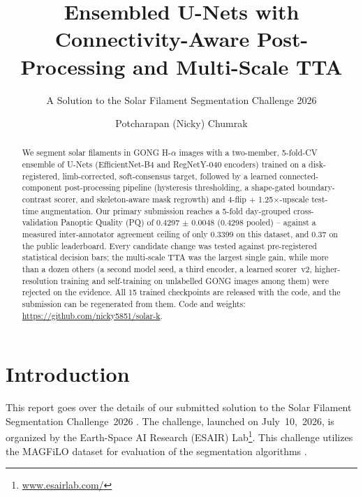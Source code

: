 \documentclass[sigconf]{acmart}
\begin{document}
\title{Ensembled U-Nets with Connectivity-Aware Post-Processing and Multi-Scale TTA}
\subtitle{A Solution to the Solar Filament Segmentation Challenge 2026} %


\author{Potcharapan (Nicky) Chumrak}

\begin{abstract}
    We segment solar filaments in GONG H-$\alpha$ images with a two-member, 5-fold-CV ensemble of
    U-Nets (EfficientNet-B4 and RegNetY-040 encoders) trained on a disk-registered,
    limb-corrected, soft-consensus target, followed by a learned connected-component
    post-processing pipeline (hysteresis thresholding, a shape-gated boundary-contrast scorer,
    and skeleton-aware mask regrowth) and 4-flip + 1.25$\times$-upscale test-time augmentation. Our
    primary submission reaches a 5-fold day-grouped cross-validation Panoptic Quality (PQ) of
    0.4297 $\pm$ 0.0048 (0.4298 pooled) -- against a measured inter-annotator agreement ceiling of
    only 0.3399 on this dataset, and 0.37 on the public leaderboard.
    Every candidate change was tested against pre-registered statistical decision bars; the
    multi-scale TTA was the largest single gain, while more than a dozen others (a second model seed,
    a third encoder, a learned scorer~v2, higher-resolution training and self-training on unlabelled
    GONG images among them) were rejected on the evidence. All 15 trained checkpoints are released with
    the code, and the submission can be regenerated from them.
    Code and weights: \url{https://github.com/nicky5851/solar-k}.
\end{abstract}

\maketitle

\ifguideStyle
{}
\par\medskip
\fi


\section{Introduction}\label{sec:intro}
    This report goes over the details of our submitted solution to the Solar Filament Segmentation Challenge~2026 \cite{filament-segmentation-2026}. The challenge, launched on July~10,~2026, is organized by the Earth-Space AI Research (ESAIR) Lab\footnote{\href{https://www.esairlab.com/home}{www.esairlab.com/}}. This challenge utilizes the MAGFiLO dataset for evaluation of the segmentation algorithms \cite{ahmadzadeh2024dataset}.
\end{document}

